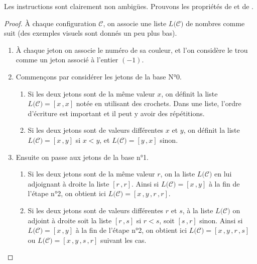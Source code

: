 \bigskip

Les instructions sont clairement non ambigües. Prouvons les propriétés de  et de .

\begin{proof}
	À chaque configuration $\mathscr{C}$, on associe une liste $L({\mathscr{C})}$ de nombres comme suit (des exemples visuels sont donnés un peu plus bas).
	
	\begin{enumerate}
		\item À chaque jeton on associe le numéro de sa couleur, et l'on considère le trou comme un jeton associé à l'entier $(-1)$.
		
		\item Commençons par considérer les jetons de la base N°0.
		
		\begin{enumerate}		
			\item Si les deux jetons sont de la même valeur $x$, on définit la liste $L({\mathscr{C})} = [x \, , x]$ notée en utilisant des crochets. Dans une liste, l'ordre d'écriture est important et il peut y avoir des répétitions.
		
			\item Si les deux jetons sont de valeurs différentes $x$ et $y$, on définit la liste $L({\mathscr{C})} = [x \, , y]$ si $x < y$, et $L({\mathscr{C})} = [y \, , x]$ sinon.
		\end{enumerate}
		
		\item Ensuite on passe aux jetons de la base n°1.
		
		\begin{enumerate}		
			\item Si les deux jetons sont de la même valeur $r$, on  la liste $L({\mathscr{C})}$ en lui adjoignant à droite la liste $[r \, , r]$. Ainsi si $L({\mathscr{C})} = [x \, , y]$ à la fin de l'étape n°2, on obtient ici $L({\mathscr{C})} = [x \, , y \, , r \, , r]$.
		
			\item Si les deux jetons sont de valeurs différentes $r$ et $s$, à la liste $L({\mathscr{C})}$ on adjoint à droite soit la liste $[r \, , s]$ si $r < s$, soit $[s \, , r]$ sinon. Ainsi si $L({\mathscr{C})} = [x \, , y]$ à la fin de l'étape n°2, on obtient ici $L({\mathscr{C})} = [x \, , y \, , r \, , s]$ ou $L({\mathscr{C})} = [x \, , y \, , s \, , r]$ suivant les cas.
		\end{enumerate}
		

\end{enumerate}
\end{proof}
